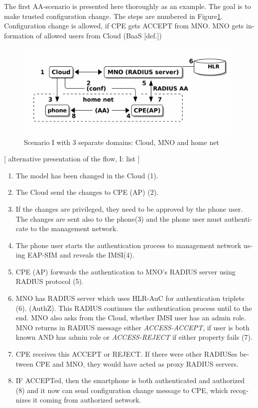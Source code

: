 \documentclass[12pt,a4paper,english]{tutthesis}
\begin{document}
\begin{otherlanguage}{english}
\label{scenario-i}
The first AA-scenario is presented here thoroughly as an example.
The goal is to make trusted configuration change. 
The steps are numbered in Figure\ref{fig:scenario-I}.
Configuration change is allowed, if CPE gets ACCEPT from MNO.  MNO gets
information of allowed users from Cloud (BaaS [def.])


\begin{figure}[htb]
\centering
\includegraphics[width=.9\linewidth]{scenI.png}
\caption{\label{fig:scenario-I}Scenario I with 3 separate domains: Cloud, MNO and home net}
\end{figure}



[ alternative presentation of the flow, I: list ] 

\begin{enumerate}
\item The model has been changed in the Cloud (1).
\item The Cloud send the changes to CPE (AP) (2).
\item If the changes are privileged, they need to be approved by the phone user.
The changes are sent also to the phone(3) and the phone user must
authenticate to the management network.
\item The phone user starts the authentication process to management
network using EAP-SIM and reveals the IMSI(4).
\item CPE (AP) forwards the authentication to MNO's RADIUS server using
RADIUS protocol (5).
\item MNO has RADIUS server which uses HLR-AuC for authentication
  triplets (6). 
  (AuthZ). This RADIUS continues the authentication process until to
  the end. 
MNO also asks from the Cloud, whether IMSI user has an admin role.
MNO returns in RADIUS message either \emph{ACCESS-ACCEPT}, if user is both
  known AND has admin role  or \emph{ACCESS-REJECT} if either property
  fails (7).
\item CPE receives this ACCEPT or REJECT. If there were other RADIUSes
between CPE and MNO, they would have acted
as proxy RADIUS servers.
\item IF ACCEPTed, then the smartphone is both authenticated and
authorized (8) and it now 
can send configuration change message to CPE, which recognizes it
coming from authorized  network.
\end{enumerate}




\end{otherlanguage}
\end{document}
